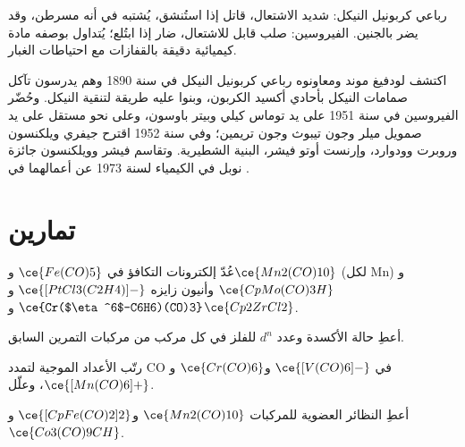 \begin{safety}{}
رباعي كربونيل النيكل: شديد الاشتعال، قاتل إذا استُنشق، يُشتبه في أنه مسرطن،
وقد يضر بالجنين. الفيروسين: صلب قابل للاشتعال، ضار إذا ابتُلع؛
يُتداول بوصفه مادة كيميائية دقيقة بالقفازات مع احتياطات الغبار.
\end{safety}

\begin{history}
اكتشف لودفيغ موند ومعاونوه رباعي كربونيل النيكل في سنة 1890 وهم
يدرسون تآكل صمامات النيكل بأحادي أكسيد الكربون، وبنوا عليه
طريقة لتنقية النيكل. وحُضّر الفيروسين في سنة 1951 على يد توماس كيلي وبيتر
باوسون، وعلى نحو مستقل على يد صمويل ميلر وجون تيبوث وجون تريمين؛ وفي سنة 1952
اقترح جيفري ويلكنسون وروبرت وودوارد، وإرنست أوتو فيشر، البنية
الشطيرية. وتقاسم فيشر وويلكنسون جائزة نوبل في الكيمياء لسنة 1973
عن أعمالهما في .
\end{history}

\section{تمارين}

\begin{exercise}[$\star$]\label{exo:b3:organometallic-bonding:1}
عُدّ إلكترونات التكافؤ في $\ce{Fe(CO)5}$ و$\ce{Mn2(CO)10}$ (لكل Mn) و$\ce{CpMo(CO)3H}$ وأنيون زايزه
$\ce{[PtCl3(C2H4)]-}$ و$\ce{Cr($\eta^6$-C6H6)(CO)3}$ و$\ce{Cp2ZrCl2}$.
\end{exercise}

\begin{exercise}[$\star$]\label{exo:b3:organometallic-bonding:2}
أعطِ حالة الأكسدة وعدد $d^n$ للفلز في كل مركب من مركبات
التمرين السابق.
\end{exercise}

\begin{exercise}[$\star$]\label{exo:b3:organometallic-bonding:3}
رتّب الأعداد الموجية لتمدد CO في $\ce{[V(CO)6]-}$ و$\ce{Cr(CO)6}$ و$\ce{[Mn(CO)6]+}$، وعلّل.
\end{exercise}

\begin{exercise}[$\star$]\label{exo:b3:organometallic-bonding:4}
أعطِ النظائر العضوية  للمركبات $\ce{Mn2(CO)10}$ و$\ce{[CpFe(CO)2]2}$ و$\ce{Co3(CO)9CH}$.
\end{exercise}

